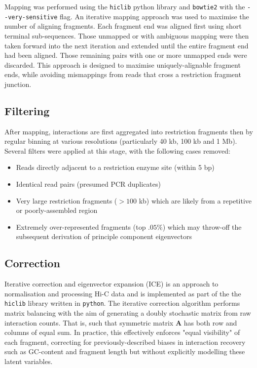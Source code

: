 \documentclass[a4paper,11pt,oneside]{book}
\begin{document}
Mapping was performed using the \texttt{hiclib} python library\citep{Imakaev2012} and \texttt{bowtie2}\citep{Langmead2012} with
the \texttt{-{}-very-sensitive} flag. An iterative mapping approach was used to maximise the number of aligning fragments.\cite{Imakaev2012} Each fragment end was aligned first using short terminal sub-sequences. Those unmapped or with ambiguous mapping were then taken forward into the next iteration and extended until the entire fragment end had been aligned. Those remaining pairs with one or more unmapped ends were discarded. This approach is designed to maximise uniquely-alignable fragment ends, while avoiding mismappings from reads that cross a restriction fragment junction.\cite{Lajoie2014} 

\subsection{Filtering}\label{methods:filtering}

After mapping, interactions are first aggregated into restriction fragments then by regular binning at various resolutions (particularly 40 kb, 100 kb and 1 Mb). Several filters were applied at this stage, with the following cases removed:\cite{Imakaev2012, Lajoie2014} 
\begin{itemize}
\item Reads directly adjacent to a restriction enzyme site (within 5 bp)
\item Identical read pairs (presumed PCR duplicates)
\item Very large restriction fragments ($>100$ kb) which are likely from a repetitive or poorly-assembled region
\item Extremely over-represented fragments (top $.05\%$) which may throw-off the subsequent derivation of principle component eigenvectors
\end{itemize}

\subsection{Correction}\label{methods:correction}

Iterative correction and eigenvector expansion (ICE) is an approach to normalisation and processing Hi-C data and is implemented as part of the the \texttt{hiclib} library written in \texttt{python}.\citep{Imakaev2012} The iterative correction algorithm performs matrix balancing with the aim of generating a doubly stochastic matrix from raw interaction counts.\cite{Lajoie2014} That is, such that symmetric matrix $\mathbf{A}$ has both row and columns of equal sum. In practice, this effectively enforces "equal visibility" of each fragment, correcting for previously-described biases in interaction recovery such as GC-content and fragment length\cite{Yaffe2011} but without explicitly modelling these latent variables. 
\end{document}
